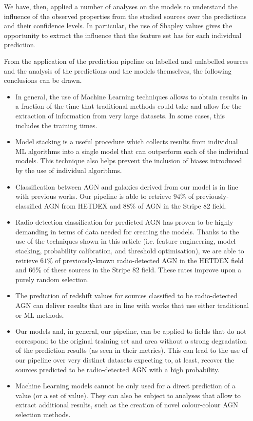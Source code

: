 \documentclass{aa}
\begin{document}
We have, then, applied a number of analyses on the models to understand the influence of the observed properties from the studied sources over the predictions and their confidence levels. In particular, the use of Shapley values gives the opportunity to extract the influence that the feature set has for each individual prediction.


From the application of the prediction pipeline on labelled and unlabelled sources and the analysis of the predictions and the models themselves, the following conclusions can be drawn.

\begin{itemize}
\item In general, the use of Machine Learning techniques allows to obtain results in a fraction of the time that traditional methods could take and allow for the extraction of information from very large datasets. In some cases, this includes the training times.
\item Model stacking is a useful procedure which collects results from individual ML algorithms into a single model that can outperform each of the individual models. This technique also helps prevent the inclusion of biases introduced by the use of individual algorithms.
\item Classification between AGN and galaxies derived from our model is in line with previous works. Our pipeline is able to retrieve $94\%$ of previously-classified AGN from HETDEX and $88\%$ of AGN in the Stripe 82 field. 
\item Radio detection classification for predicted AGN has proven to be highly demanding in terms of data needed for creating the models. Thanks to the use of the techniques shown in this article (i.e. feature engineering, model stacking, probability calibration, and threshold optimisation), we are able to retrieve $61\%$ of previously-known radio-detected AGN in the HETDEX field and $66\%$ of these sources in the Stripe 82 field. These rates improve upon a purely random selection.
\item The prediction of redshift values for sources classified to be radio-detected AGN can deliver results that are in line with works that use either traditional or ML methods.
\item Our models and, in general, our pipeline, can be applied to fields that do not correspond to the original training set and area without a strong degradation of the prediction results (as seen in their metrics). This can lead to the use of our pipeline over very distinct datasets expecting to, at least, recover the sources predicted to be radio-detected AGN with a high probability.
\item Machine Learning models cannot be only used for a direct prediction of a value (or a set of value). They can also be subject to analyses that allow to extract additional results, such as the creation of novel colour-colour AGN selection methods.
\end{itemize}
\end{document}
